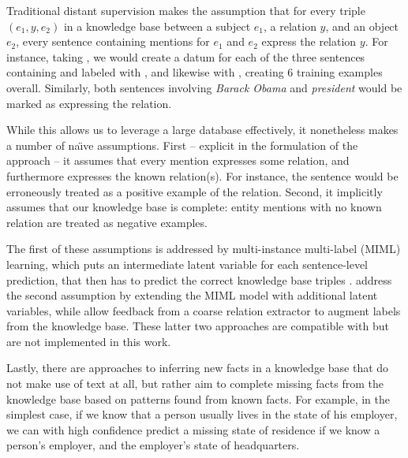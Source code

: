 
Traditional distant supervision makes the assumption that
  for every triple $(e_1, y, e_2)$ in a knowledge base between
  a subject $e_1$, a relation $y$, and an object $e_2$, every sentence
  containing mentions for $e_1$ and $e_2$ express the relation $y$.
For instance, taking , we would create a datum for each
  of the three sentences containing  and 
  labeled with , and likewise with
  , creating 6 training examples overall.
Similarly, both sentences involving \textit{Barack Obama} and
  \textit{president} would be marked as expressing the 
  relation.

While this allows us to leverage a large database effectively, it
  nonetheless makes a number of na\"{\i}ve assumptions.
First -- explicit in the formulation of the approach -- it assumes that every
  mention expresses some relation,
  and furthermore expresses the known relation(s).
For instance, the sentence  would be erroneously
  treated as a positive example of the  relation.
Second, it implicitly assumes that our knowledge base is complete:
  entity mentions with no known relation are treated as negative examples.

The first of these assumptions is addressed by
  multi-instance multi-label (MIML) learning, which puts an intermediate latent variable
  for each sentence-level prediction, that then has to predict the correct knowledge base
  triples \cite{key:2012surdeanu-mimlre}.
 address the second assumption by extending the
  MIML model with additional latent variables, while 
  allow feedback from a coarse relation extractor to augment labels from the knowledge base.
These latter two approaches are compatible with but are 
  not implemented in this work.



Lastly, there are approaches to inferring new facts in a knowledge base that do not
  make use of text at all, but rather aim to complete missing facts from the knowledge
  base based on patterns found from known facts.
For example, in the simplest case, if we know that a person usually lives in the state 
  of his employer, we can with high confidence predict a missing state of residence if
  we know a person's employer, and the employer's state of headquarters.

